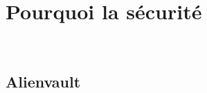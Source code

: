 \chapter{Pourquoi la sécurité}
\blindtext\\

\section{Alienvault}
\label{presentationalienvault}

\blindtext\\

\blindtext\\

\blindtext\\